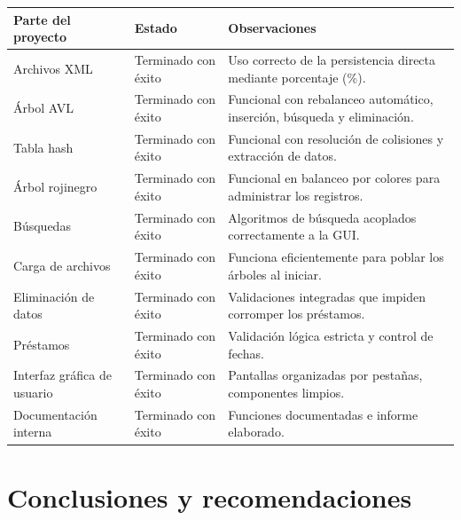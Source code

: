 \documentclass[11pt]{article}
\begin{document}
\begin{longtable}{p{} p{} p{}}
\toprule
\textbf{Parte del proyecto} & \textbf{Estado} & \textbf{Observaciones} \\
\midrule
Archivos XML & Terminado con éxito & Uso correcto de la persistencia directa mediante porcentaje (\%). \\
Árbol AVL & Terminado con éxito & Funcional con rebalanceo automático, inserción, búsqueda y eliminación. \\
Tabla hash & Terminado con éxito & Funcional con resolución de colisiones y extracción de datos. \\
Árbol rojinegro & Terminado con éxito & Funcional en balanceo por colores para administrar los registros. \\
Búsquedas & Terminado con éxito & Algoritmos de búsqueda acoplados correctamente a la GUI. \\
Carga de archivos & Terminado con éxito & Funciona eficientemente para poblar los árboles al iniciar. \\
Eliminación de datos & Terminado con éxito & Validaciones integradas que impiden corromper los préstamos. \\
Préstamos & Terminado con éxito & Validación lógica estricta y control de fechas. \\
Interfaz gráfica de usuario & Terminado con éxito & Pantallas organizadas por pestañas, componentes limpios. \\
Documentación interna & Terminado con éxito & Funciones documentadas e informe elaborado. \\
\bottomrule
\end{longtable}

\section{Conclusiones y recomendaciones}
\end{document}
